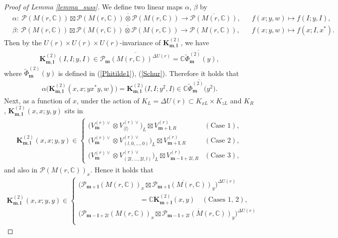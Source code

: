 \documentclass[pdftex]{sigma}
\numberwithin{equation}{section}
\newcommand{\bK}{\mathbf{K}}
\newcommand{\bl}{\mathbf{l}}
\newcommand{\bm}{\mathbf{m}}
\newcommand{\BC}{\mathbb{C}}
\newcommand{\cP}{\mathcal{P}}
\begin{document}
\begin{proof}[Proof of Lemma \ref{lemma_suss}]
We define two linear maps $\alpha$, $\beta$ by
\begin{align*}
&\alpha\colon \ \cP(M(r,\BC))\boxtimes\overline{\cP(M(r,\BC))\otimes\cP(M(r,\BC))}\longrightarrow \overline{\cP(M(r,\BC))},&
&f(x;y,w)\mapsto f(I;y,I),\\
&\beta\colon \ \cP(M(r,\BC))\boxtimes\overline{\cP(M(r,\BC))\otimes\cP(M(r,\BC))}\longrightarrow \cP(M(r,\BC)),&
&f(x;y,w)\mapsto f(x;I,x^*).
\end{align*}
Then by the $U(r)\times U(r)\times U(r)$-invariance of $\bK_{\bm,\bl}^{(2)}$, we have
\begin{gather*} \bK_{\bm,\bl}^{(2)}(I,I;y,I)\in \overline{\cP_\bm(M(r,\BC))^{\Delta U(r)}}=\overline{\BC\tilde{\Phi}_\bm^{(2)}(y)}, \end{gather*}
where $\tilde{\Phi}_\bm^{(2)}(y)$ is defined in (\ref{Phitilde1}), (\ref{Schur}). Therefore it holds that
\begin{gather*} \alpha\big(\bK_{\bm,\bl}^{(2)}(x,x;yx^*y,w)\big)=\bK_{\bm,\bl}^{(2)}\big(I,I;y^2,I\big)\in\overline{\BC\tilde{\Phi}_\bm^{(2)}\big(y^2\big)}. \end{gather*}
Next, as a function of $x$, under the action of $K_L=\Delta U(r)\subset K_{xL}\times K_{zL}$ and $K_R$,
$\bK_{\bm,\bl}^{(2)}(x,x;y,y)$ sits in
\begin{gather*} \bK_{\bm,\bl}^{(2)}(x,x;y,y)\in\begin{cases}
\big(V_{\bm}^{(r)\vee}\otimes V_{\langle l\rangle}^{(r)\vee}\big)_L\boxtimes V_{\bm+\bl,R}^{(r)} & (\text{Case }1),\\
\big(V_{\bm}^{(r)\vee}\otimes V_{(l,0,\ldots,0)}^{(r)\vee}\big)_L\boxtimes V_{\bm+\bl,R}^{(r)} & (\text{Case }2),\\
\big(V_{\bm}^{(r)\vee}\otimes V_{(2l,\ldots,2l,l)}^{(r)\vee}\big)_L\boxtimes V_{\bm-\bl+2l,R}^{(r)} & (\text{Case }3), \end{cases} \end{gather*}
and also in $\cP(M(r,\BC))_x$. Hence it holds that
\begin{gather*} \bK_{\bm,\bl}^{(2)}(x,x;y,y)\in \begin{cases}
\big(\cP_{\bm+\bl}(M(r,\BC))_x\boxtimes\overline{\cP_{\bm+\bl}(M(r,\BC))_y}\big)^{\Delta U(r)}\\
\hspace{105pt} {}=\BC \bK_{\bm+\bl}^{(2)}(x,y)\quad (\text{Cases 1, 2}),\\
\big(\cP_{\bm-\bl+2l}(M(r,\BC))_x\boxtimes\overline{\cP_{\bm-\bl+2l}(M(r,\BC))_y}\big)^{\Delta U(r)}\\

\end{cases}
\end{gather*}
\end{proof}
\end{document}
